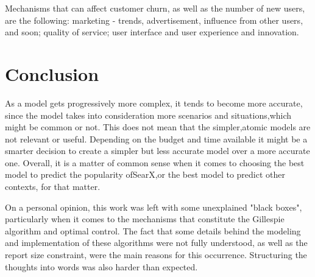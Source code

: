 \documentclass{article}
\begin{document}
Mechanisms‌ ‌that‌ ‌can‌ ‌affect‌ ‌customer‌ ‌churn,‌ ‌as‌ ‌well‌ ‌as‌ ‌the‌ ‌number‌ ‌of‌ ‌new‌ ‌users,‌ ‌are‌ ‌the‌‌ following:‌ ‌marketing‌ ‌-‌ ‌trends,‌ ‌advertisement,‌ ‌influence‌ ‌from‌ ‌other‌ ‌users,‌ ‌and‌ ‌so‌‌on; ‌‌quality‌‌ of‌‌ service;‌ ‌user‌ ‌interface‌ ‌and‌ ‌user‌ ‌experience‌ ‌and‌ ‌innovation.‌

\section{Conclusion}

As‌ ‌a‌ ‌model‌ ‌gets‌ ‌progressively‌ ‌more‌ ‌complex,‌ ‌it‌ ‌tends‌ ‌to‌ ‌become‌ ‌more‌ ‌accurate,‌ ‌since‌ ‌the‌‌ model‌ ‌takes‌ ‌into ‌‌consideration‌‌ more‌‌ scenarios‌‌ and‌‌ situations,‌‌which‌‌ might‌‌ be‌‌ common‌‌ or‌‌ not.‌‌ This‌ ‌does not ‌mean‌‌ that‌‌ the‌‌ simpler,‌‌atomic‌‌ models‌‌ are not relevant‌‌ or‌‌ useful.‌‌ Depending‌‌ on‌‌ the‌‌ budget‌ ‌and‌‌ time‌‌ available ‌‌it‌‌ might‌‌ be‌‌ a‌‌ smarter‌‌ decision‌‌ to‌‌ create‌‌ a‌‌ simpler‌‌ but‌‌ less‌‌ accurate‌‌ model‌ ‌over‌ ‌a‌ ‌more‌ ‌accurate‌ ‌one.‌ ‌Overall,‌ ‌it‌ ‌is‌ ‌a‌ ‌matter‌ ‌of‌ ‌common‌ ‌sense‌ ‌when‌ ‌it‌ ‌comes‌ ‌to‌‌ choosing‌ ‌the‌ ‌best‌ ‌model‌ ‌to‌ ‌predict‌ ‌the‌ ‌popularity‌ ‌of‌‌SearX,‌‌or‌‌ the‌‌ best‌‌ model‌‌ to‌‌ predict‌‌ other‌‌ contexts,‌ for‌ ‌that‌ ‌matter.‌

On‌ ‌a‌ ‌personal‌ ‌opinion,‌ ‌this‌ ‌work‌ ‌was‌ ‌left‌ ‌with‌ ‌some‌ ‌unexplained‌ "black‌ ‌boxes",‌ ‌particularly‌‌ when‌ ‌it‌ ‌comes‌ ‌to‌ ‌the‌ ‌mechanisms‌ ‌that‌ ‌constitute‌ ‌the‌ ‌Gillespie‌ ‌algorithm‌ ‌and‌ ‌optimal‌ ‌control.‌‌ The‌ ‌fact‌ ‌that‌ ‌some‌ ‌details‌ ‌behind‌ ‌the‌ ‌modeling‌ ‌and‌ ‌implementation‌ ‌of‌ ‌these‌‌ algorithms ‌‌were‌‌ not‌ ‌fully‌ ‌understood,‌ ‌as‌ ‌well‌ ‌as‌ ‌the‌ ‌report‌ ‌size‌ ‌constraint,‌ ‌were‌ ‌the‌ ‌main‌ ‌reasons‌ ‌for‌ ‌this‌‌ occurrence.‌ ‌Structuring‌ ‌the‌ ‌thoughts‌ ‌into‌ ‌words‌ ‌was‌ ‌also‌ ‌harder‌ ‌than‌ ‌expected.‌

% 
\end{document}
